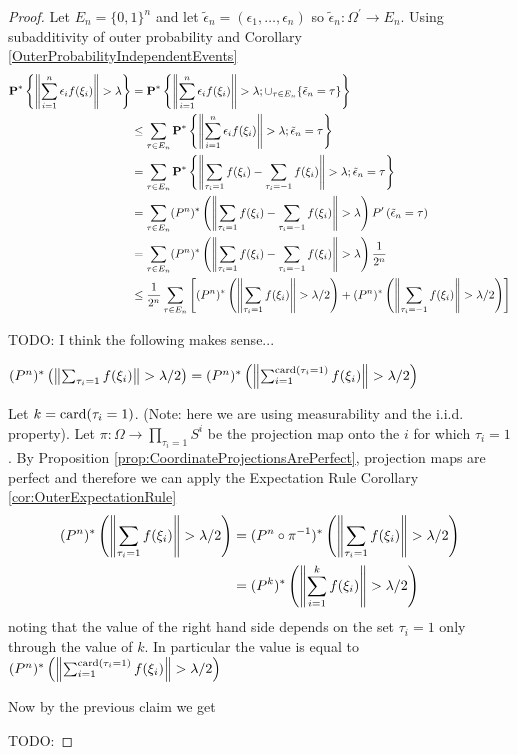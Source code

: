 \begin{proof}
Let $E_n = \lbrace 0, 1 \rbrace^n$ and let $\tilde{\epsilon}_n = (\epsilon_1, \dotsc, \epsilon_n)$ so $\tilde{\epsilon}_n : \Omega^\prime \to E_n$.  
Using subadditivity of outer probability  and Corollary \ref{OuterProbabilityIndependentEvents}
\begin{align*}
\textbf{P}^* \left \{\left \lVert \sum_{i=1}^n \epsilon_i f(\xi_i) \right \rVert > \lambda \right \}
&= \textbf{P}^* \left \{\left \lVert \sum_{i=1}^n \epsilon_i f(\xi_i) \right \rVert > \lambda ; \cup_{\tau \in E_n} \lbrace \tilde{\epsilon}_n = \tau \rbrace  \right \} \\
&\leq \sum_{\tau \in E_n} \textbf{P}^* \left \{\left \lVert \sum_{i=1}^n \epsilon_i f(\xi_i) \right \rVert > \lambda ; \tilde{\epsilon}_n = \tau \right \} \\
&= \sum_{\tau \in E_n} \textbf{P}^* \left \{\left \lVert \sum_{\tau_i=1} f(\xi_i) -\sum_{\tau_i=-1} f(\xi_i)  \right \rVert > \lambda ; \tilde{\epsilon}_n = \tau \right \} \\
&= \sum_{\tau \in E_n} (P^n)^*\left (\left \lVert \sum_{\tau_i=1} f(\xi_i) -\sum_{\tau_i=-1} f(\xi_i)  \right \rVert > \lambda \right )  P^\prime \left(\tilde{\epsilon}_n = \tau\right ) \\
&= \sum_{\tau \in E_n} (P^n)^*\left (\left \lVert \sum_{\tau_i=1} f(\xi_i) -\sum_{\tau_i=-1} f(\xi_i)  \right \rVert > \lambda \right )  \frac{1}{2^n}\\
&\leq \frac{1}{2^n} \sum_{\tau \in E_n} \left [ (P^n)^*\left (\left \lVert \sum_{\tau_i=1} f(\xi_i) \right \rVert > \lambda/2 \right) + (P^n)^*\left (\left \lVert \sum_{\tau_i=-1} f(\xi_i)  \right \rVert > \lambda/2 \right )  \right ] \\
\end{align*}

TODO: I think the following makes sense...  
\begin{clm} $(P^n)^*\left (\left \lVert \sum_{\tau_i=1} f(\xi_i) \right \rVert > \lambda/2 \right)= (P^n)^*\left (\left \lVert \sum_{i=1}^{\operatorname*{card}(\tau_i=1)} f(\xi_i) \right \rVert > \lambda/2 \right)$ 
\end{clm}
Let $k = \operatorname*{card}(\tau_i = 1)$.  (Note: here we are using measurability and the i.i.d. property).  Let $\pi : \Omega \to \prod_{\tau_i =1} S^i$ be the projection map onto the $i$ for which $\tau_i=1$.  By Proposition \ref{prop:CoordinateProjectionsArePerfect}, projection maps are perfect and therefore we can apply the Expectation Rule Corollary \ref{cor:OuterExpectationRule}
\begin{align*}
(P^n)^*\left (\left \lVert \sum_{\tau_i=1} f(\xi_i) \right \rVert > \lambda/2 \right) &= (P^n \circ \pi^{-1})^*\left (\left \lVert \sum_{\tau_i=1} f(\xi_i) \right \rVert > \lambda/2 \right) \\
&= (P^k)^*\left (\left \lVert \sum_{i=1}^k f(\xi_i) \right \rVert > \lambda/2 \right) 
\end{align*}
noting that the value of the right hand side depends on the set $\tau_i=1$ only through the value of $k$.  In particular the value is equal to $(P^n)^*\left (\left \lVert \sum_{i=1}^{\operatorname*{card}(\tau_i=1)} f(\xi_i) \right \rVert > \lambda/2 \right)$

Now by the previous claim we get

TODO:
\end{proof}


